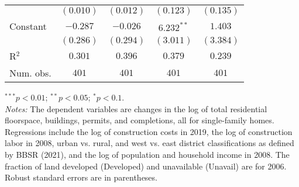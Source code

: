 \begin{table}[H]
\begin{center}
\begin{footnotesize}
\begin{threeparttable}
\begin{tabular}{l c c c c}
                                     & $(0.010)$      & $(0.012)$      & $(0.123)$      & $(0.135)$      \\
Constant                             & $-0.287$       & $-0.026$       & $6.232^{**}$   & $1.403$        \\
                                     & $(0.286)$      & $(0.294)$      & $(3.011)$      & $(3.384)$      \\
\midrule
R$^2$                                & $0.301$        & $0.396$        & $0.379$        & $0.239$        \\
Num. obs.                            & $401$          & $401$          & $401$          & $401$          \\
\bottomrule
\end{tabular}
\begin{tablenotes}[flushleft]
\tiny{\item $^{***}p<0.01$; $^{**}p<0.05$; $^{*}p<0.1$. \\ \textit{Notes:} The dependent variables are changes in the log of total residential floorspace, buildings, permits, and completions, all for single-family homes. Regressions include the log of construction costs in 2019, the log of construction labor in 2008, urban vs. rural, and west vs. east district classifications as defined by BBSR (2021), and the log of population and household income in 2008. The fraction of land developed (Developed) and unavailable (Unavail) are for 2006. Robust standard errors are in parentheses.}
\end{tablenotes}
\end{threeparttable}
\end{footnotesize}
\label{tab:ols-results--single-family-checked}
\end{center}
\end{table}

